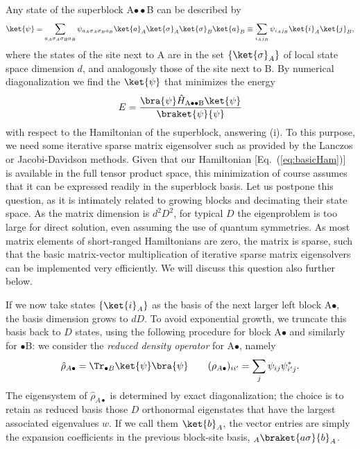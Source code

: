 Any state of the superblock A$\bullet\bullet$B can be described by 
\begin{equation}
\ket{\psi}= \sum_{a_A \sigma_A \sigma_B a_B} \psi_{a_A \sigma_A \sigma_B a_B} \ket{a}_A \ket{\sigma}_A \ket{\sigma}_B \ket{a}_B \equiv \sum_{i_A j_B} \psi_{i_A j_B} \ket{i}_A \ket{j}_B,
\label{US:eq:DMRGstate}
\end{equation} 
where the states of the site next to A are in the set $\{ \ket{\sigma}_A \}$ of local state space dimension $d$, and analogously those of the site next to B. By numerical diagonalization we find the $\ket{\psi}$ that minimizes the energy
\begin{equation}
E = \frac{\bra{\psi} \hat{H}_{{\rm A}\bullet\bullet{\rm B}} \ket{\psi}}{\braket{\psi}{\psi}}
\end{equation}
with respect to the Hamiltonian of the superblock, answering (i). To this purpose, we need some iterative sparse matrix eigensolver such as provided by the Lanczos or Jacobi-Davidson methods. Given that our Hamiltonian [Eq.~(\ref{eq:basicHam})] is available in the full tensor product space, this minimization of course assumes that it can be expressed readily in the superblock basis. Let us postpone this question, as it is intimately related to growing blocks and decimating their state space. As the matrix dimension is $d^2 D^2$, for typical $D$ the eigenproblem is too large for direct solution, even assuming the use of quantum symmetries. As most matrix elements of short-ranged Hamiltonians are zero, the matrix is sparse, such that the basic matrix-vector multiplication of iterative sparse matrix eigensolvers can be implemented very efficiently. We will discuss this question also further below. 

If we now take states $\{ \ket{i}_A \}$ as the basis of the next larger left block A$\bullet$, the basis dimension grows to $dD$. To avoid exponential growth, we truncate this basis back to $D$ states, using the following procedure for block A$\bullet$ and similarly for $\bullet$B: we consider the {\em reduced density operator} for A$\bullet$, namely
\begin{equation}
\hat{\rho}_{A\bullet} = \Tr_{\bullet B} \ket{\psi}\bra{\psi} 	\quad\quad (\rho_{A\bullet})_{ii'} = \sum_j \psi_{ij}\psi^*_{i'j} .  
\end{equation}
The eigensystem of $\hat{\rho}_{A\bullet}$ is determined by exact diagonalization; the choice is to retain as reduced basis those $D$ orthonormal eigenstates that have the largest associated eigenvalues $w$. If we call them $\ket{b}_A$, the vector entries are simply the expansion coefficients in the previous block-site basis, $_A \braket{a \sigma}{b}_A$. 

